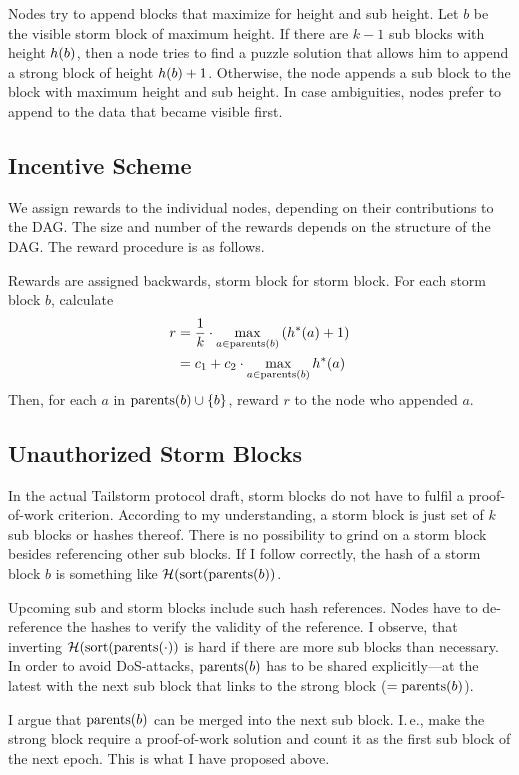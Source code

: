 Nodes try to append blocks that maximize for height and sub height.
Let $b$ be the visible storm block of maximum height.
If there are $k-1$ sub blocks with height $h(b)$, then a node tries to find a puzzle solution that allows him to append a strong block of height $h(b) + 1$.
Otherwise, the node appends a sub block to the block with maximum height and sub height.
In case ambiguities, nodes prefer to append to the data that became visible first.

\subsection{Incentive Scheme}

We assign rewards to the individual nodes, depending on their contributions to the DAG.
The size and number of the rewards depends on the structure of the DAG.
The reward procedure is as follows.

Rewards are assigned backwards, storm block for storm block.
For each storm block $b$, calculate
\begin{align}
  r &= \frac1k \cdot \max_{a \in \operatorname{parents}(b)}\left(h^*(a) + 1\right) \\
    &= c_1 + c_2 \cdot \max_{a \in \operatorname{parents}(b)}h^*(a)
\end{align}
Then, for each $a$ in $\operatorname{parents}(b) \cup \{b\}$, reward $r$ to the node who appended $a$.

\subsection{Unauthorized Storm Blocks}

In the actual Tailstorm protocol draft, storm blocks do not have to fulfil a proof-of-work criterion.
According to my understanding, a storm block is just set of $k$ sub blocks or hashes thereof.
There is no possibility to grind on a storm block besides referencing other sub blocks.
If I follow correctly, the hash of a storm block $b$ is something like $\mathcal{H}(\operatorname{sort}(\operatorname{parents}(b))$.

Upcoming sub and storm blocks include such hash references.
Nodes have to de-reference the hashes to verify the validity of the reference.
I observe, that inverting $\mathcal{H}(\operatorname{sort}(\operatorname{parents}(\cdot))$ is hard if there are more sub blocks than necessary.
In order to avoid DoS-attacks, $\operatorname{parents}(b)$ has to be shared explicitly---at the latest with the next sub block that links to the strong block ($=\operatorname{parents}(b)$).

I argue that $\operatorname{parents}(b)$ can be merged into the next sub block.
I.\,e., make the strong block require a proof-of-work solution and count it as the first sub block of the next epoch.
This is what I have proposed above.

\egroup %
